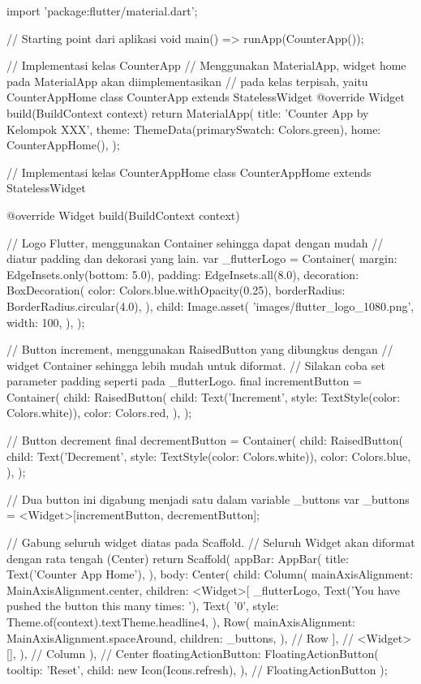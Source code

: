 \documentclass[a4paper,11pt]{article} %
\begin{document}
\begin{dartcode}
import 'package:flutter/material.dart';

// Starting point dari aplikasi
void main() => runApp(CounterApp());

// Implementasi kelas CounterApp
// Menggunakan MaterialApp, widget home pada MaterialApp akan diimplementasikan
// pada kelas terpisah, yaitu CounterAppHome
class CounterApp extends StatelessWidget {
  @override
  Widget build(BuildContext context) {
    return MaterialApp(
      title: 'Counter App by Kelompok XXX',
      theme: ThemeData(primarySwatch: Colors.green),
      home: CounterAppHome(),
    );
  }
}

// Implementasi kelas CounterAppHome
class CounterAppHome extends StatelessWidget {

  @override
  Widget build(BuildContext context) {
    
    // Logo Flutter, menggunakan Container sehingga dapat dengan mudah
    // diatur padding dan dekorasi yang lain.
    var _flutterLogo = Container(
      margin: EdgeInsets.only(bottom: 5.0),
      padding: EdgeInsets.all(8.0),
      decoration: BoxDecoration(
        color: Colors.blue.withOpacity(0.25),
        borderRadius: BorderRadius.circular(4.0),
      ),
      child: Image.asset(
        'images/flutter_logo_1080.png',
        width: 100,
      ),
    );

    // Button increment, menggunakan RaisedButton yang dibungkus dengan
    // widget Container sehingga lebih mudah untuk diformat.
    // Silakan coba set parameter padding seperti pada _flutterLogo.
    final incrementButton = Container(
      child: RaisedButton(
        child: Text('Increment', style: TextStyle(color: Colors.white)),
        color: Colors.red,
      ),
    );

    // Button decrement
    final decrementButton = Container(
      child: RaisedButton(
        child: Text('Decrement', style: TextStyle(color: Colors.white)),
        color: Colors.blue,
      ),
    );

    // Dua button ini digabung menjadi satu dalam variable _buttons
    var _buttons = <Widget>[incrementButton, decrementButton];

    
    // Gabung seluruh widget diatas pada Scaffold.
    // Seluruh Widget akan diformat dengan rata tengah (Center)
    return Scaffold(
      appBar: AppBar(
        title: Text('Counter App Home'),
      ),
      body: Center(
        child: Column(
          mainAxisAlignment: MainAxisAlignment.center,
          children: <Widget>[
            _flutterLogo,
            Text('You have pushed the button this many times: '),
            Text(
              '0',
              style: Theme.of(context).textTheme.headline4,
            ),
            Row(
              mainAxisAlignment: MainAxisAlignment.spaceAround,
              children: _buttons,
            ), // Row
          ], // <Widget>[],
        ), // Column
      ), // Center
      floatingActionButton: FloatingActionButton(
        tooltip: 'Reset',
        child: new Icon(Icons.refresh),
      ), // FloatingActionButton
    );
  }
}
\end{dartcode}
\end{document}
